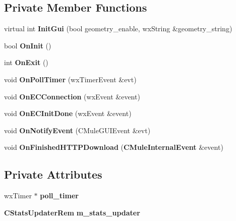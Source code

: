 \subsection*{Private Member Functions}
\begin{DoxyCompactItemize}
\item 
virtual int {\bfseries InitGui} (bool geometry\_\-enable, wxString \&geometry\_\-string)\label{classCamuleRemoteGuiApp_ad0fc24f50f199c1ca6fc20ceba749360}

\item 
bool {\bfseries OnInit} ()\label{classCamuleRemoteGuiApp_ab8046d31f190d64a5222b95331f33b8e}

\item 
int {\bfseries OnExit} ()\label{classCamuleRemoteGuiApp_a8c32f20e3e675b600ec2a3841a9f3964}

\item 
void {\bfseries OnPollTimer} (wxTimerEvent \&evt)\label{classCamuleRemoteGuiApp_a314d92a1781358ccf443c0b4d6f4b308}

\item 
void {\bfseries OnECConnection} (wxEvent \&event)\label{classCamuleRemoteGuiApp_aa564ecfa9a32ff614f61970bec678177}

\item 
void {\bfseries OnECInitDone} (wxEvent \&event)\label{classCamuleRemoteGuiApp_ada32ab0298991b8bc83cc6ffd0473128}

\item 
void {\bfseries OnNotifyEvent} (CMuleGUIEvent \&evt)\label{classCamuleRemoteGuiApp_aa00cb6a3d04a1e0dcec51688d004b3d1}

\item 
void {\bfseries OnFinishedHTTPDownload} ({\bf CMuleInternalEvent} \&event)\label{classCamuleRemoteGuiApp_a5a320a6899fa525ef7453de7849bf7d6}

\end{DoxyCompactItemize}
\subsection*{Private Attributes}
\begin{DoxyCompactItemize}
\item 
wxTimer $\ast$ {\bfseries poll\_\-timer}\label{classCamuleRemoteGuiApp_a85b963c4f7e4ff61ea98d4db1784cc36}

\item 
{\bf CStatsUpdaterRem} {\bfseries m\_\-stats\_\-updater}\label{classCamuleRemoteGuiApp_aa4d0775cee38229292162cd24ccf7b1a}

\end{DoxyCompactItemize}


